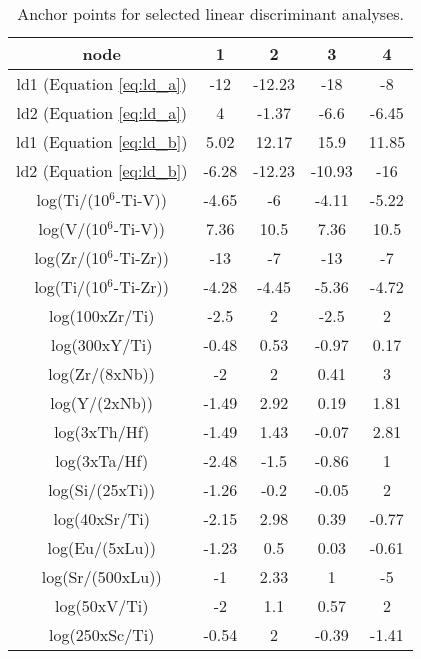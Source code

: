 \begin{table}
\centering
\begin{tabular}{ccccc}
\hline
  node &  1 &  2 &  3 &  4 \\
\hline
\hline
ld1 (Equation \ref{eq:ld_a}) &  -12 & -12.23 &  -18 &   -8 \\
ld2 (Equation \ref{eq:ld_a})&  4 &  -1.37 & -6.6 &  -6.45 \\
\hline
ld1 (Equation \ref{eq:ld_b})& 5.02 &  12.17 & 15.9 &  11.85 \\
ld2 (Equation \ref{eq:ld_b})&  -6.28 & -12.23 & -10.93 &  -16 \\
\hline
log(Ti/(10$^6$-Ti-V)) &  -4.65 &   -6 &  -4.11 &  -5.22 \\
log(V/(10$^6$-Ti-V)) & 7.36 & 10.5 & 7.36 & 10.5 \\
\hline
log(Zr/(10$^6$-Ti-Zr)) &  -13 &   -7 &  -13 &   -7 \\
log(Ti/(10$^6$-Ti-Zr)) &  -4.28 &  -4.45 &  -5.36 &  -4.72 \\
\hline
log(100xZr/Ti) & -2.5 &  2 & -2.5 &  2 \\
log(300xY/Ti) &  -0.48 & 0.53 &  -0.97 & 0.17 \\
\hline
log(Zr/(8xNb)) &   -2 &  2 & 0.41 &  3 \\
log(Y/(2xNb)) &  -1.49 & 2.92 & 0.19 & 1.81 \\
\hline
log(3xTh/Hf) &  -1.49 & 1.43 &  -0.07 & 2.81 \\
log(3xTa/Hf) &  -2.48 & -1.5 &  -0.86 &  1 \\
\hline
log(Si/(25xTi)) &  -1.26 & -0.2 &  -0.05 &  2 \\
log(40xSr/Ti) &  -2.15 & 2.98 & 0.39 &  -0.77 \\
\hline
log(Eu/(5xLu)) &  -1.23 &  0.5 & 0.03 &  -0.61 \\
log(Sr/(500xLu)) &   -1 & 2.33 &  1 &   -5 \\
\hline
log(50xV/Ti) &   -2 &  1.1 & 0.57 &  2 \\
log(250xSc/Ti) &  -0.54 &  2 &  -0.39 &  -1.41 \\
\hline
\end{tabular}
\caption{Anchor points for selected linear discriminant analyses.}
\label{tab:anchors}
\end{table}

